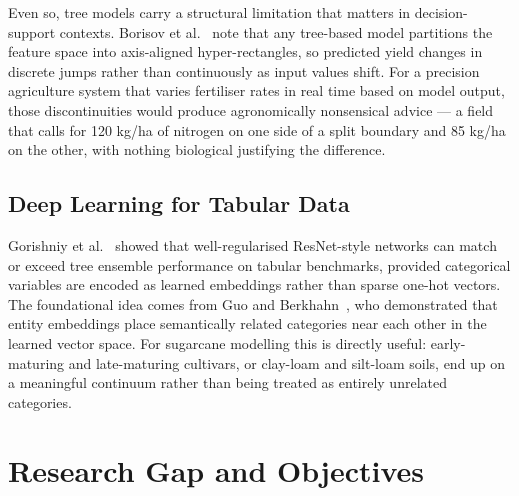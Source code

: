 \documentclass[conference,10pt,letterpaper]{IEEEtran}
\begin{document}
Even so, tree models carry a structural limitation that matters in decision-support contexts. Borisov et al.~\cite{borisov2022deep} note that any tree-based model partitions the feature space into axis-aligned hyper-rectangles, so predicted yield changes in discrete jumps rather than continuously as input values shift. For a precision agriculture system that varies fertiliser rates in real time based on model output, those discontinuities would produce agronomically nonsensical advice --- a field that calls for 120 kg/ha of nitrogen on one side of a split boundary and 85 kg/ha on the other, with nothing biological justifying the difference.

\subsection{Deep Learning for Tabular Data}
Gorishniy et al.~\cite{gorishniy2021revisiting} showed that well-regularised ResNet-style networks can match or exceed tree ensemble performance on tabular benchmarks, provided categorical variables are encoded as learned embeddings rather than sparse one-hot vectors. The foundational idea comes from Guo and Berkhahn~\cite{guo2016entity}, who demonstrated that entity embeddings place semantically related categories near each other in the learned vector space. For sugarcane modelling this is directly useful: early-maturing and late-maturing cultivars, or clay-loam and silt-loam soils, end up on a meaningful continuum rather than being treated as entirely unrelated categories.

\section{Research Gap and Objectives}
\end{document}

